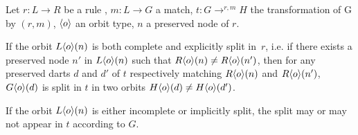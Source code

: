 \begin{proposition}\label{prop:orbit-split}
  Let $r : L \longrightarrow R$ be a rule , $m : L \to G$ a match,
  $t : G \longrightarrow^{r,m} H$ the transformation of G by $(r, m)$,
  $\langle o\rangle$ an orbit type, $n$ a preserved node of $r$.

  If the orbit $L\langle o\rangle(n)$ is both complete and  explicitly split in~$r$, i.e. if there exists a preserved node $n'$ in $L\langle o\rangle(n)$ such that $R\langle o\rangle(n) \neq R\langle o\rangle(n')$, then for any preserved darts $d$ and $d'$ of $t$ respectively matching $R\langle o\rangle(n)$ and $R\langle o\rangle(n')$,  $G\langle o\rangle(d)$ is split in $t$ in two orbits $H\langle o\rangle(d) \neq H\langle o\rangle(d')$.

  If the orbit $L\langle o\rangle(n)$ is either incomplete or implicitly split, the split may or may not appear in $t$ according to $G$.
\end{proposition}

